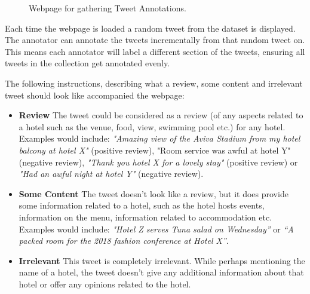 \begin{figure}[h!]
\centering
{}
\caption{\label{fig:webpage} Webpage for gathering Tweet Annotations.}
\end{figure}

Each time the webpage is loaded a random tweet from the dataset is displayed. The annotator can annotate the tweets incrementally from that random tweet on. This means each annotator will label a different section of the tweets, ensuring all tweets in the collection get annotated evenly.

The following instructions, describing what a review, some content and irrelevant tweet should look like accompanied the webpage:
\begin{itemize}
    \item \textbf{Review} \newline
    The tweet could be considered as a review (of any aspects related to a hotel such as the venue, food, view, swimming pool etc.) for any hotel. Examples would include: \emph{"Amazing view of the Aviva Stadium from my hotel balcony at hotel X"} (positive review), "Room service was awful at hotel Y" (negative review), \emph{"Thank you hotel X for a lovely stay"} (positive review) or \emph{"Had an awful night at hotel Y"} (negative review).
    \item \textbf{Some Content} \newline
    The tweet doesn't look like a review, but it does provide some information related to a hotel, such as the hotel hosts events, information on the menu, information related to accommodation etc. Examples would include: \emph{"Hotel Z serves Tuna salad on Wednesday”} or \emph{“A packed room for the 2018 fashion conference at Hotel X”}.
    \item \textbf{Irrelevant} \newline
    This tweet is completely irrelevant. While perhaps mentioning the name of a hotel, the tweet doesn't give any additional information about that hotel or offer any opinions related to the hotel.
\end{itemize}

